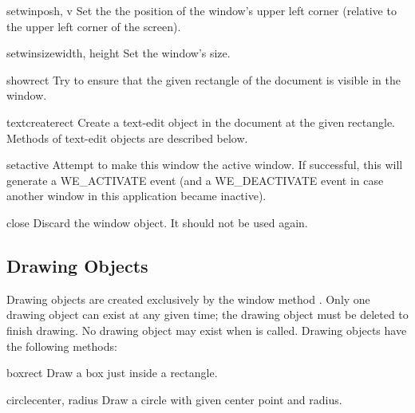 \begin{methoddesc}[window]{setwinpos}{h, v}
Set the the position of the window's upper left corner (relative to
the upper left corner of the screen).
\end{methoddesc}

\begin{methoddesc}[window]{setwinsize}{width, height}
Set the window's size.
\end{methoddesc}

\begin{methoddesc}[window]{show}{rect}
Try to ensure that the given rectangle of the document is visible in
the window.
\end{methoddesc}

\begin{methoddesc}[window]{textcreate}{rect}
Create a text-edit object in the document at the given rectangle.
Methods of text-edit objects are described below.
\end{methoddesc}

\begin{methoddesc}[window]{setactive}{}
Attempt to make this window the active window.  If successful, this
will generate a WE_ACTIVATE event (and a WE_DEACTIVATE event in case
another window in this application became inactive).
\end{methoddesc}

\begin{methoddesc}[window]{close}{}
Discard the window object.  It should not be used again.
\end{methoddesc}

\subsection{Drawing Objects}

Drawing objects are created exclusively by the window method
.  Only one drawing object can exist at any
given time; the drawing object must be deleted to finish drawing.  No
drawing object may exist when  is called.
Drawing objects have the following methods:

\begin{methoddesc}[drawing]{box}{rect}
Draw a box just inside a rectangle.
\end{methoddesc}

\begin{methoddesc}[drawing]{circle}{center, radius}
Draw a circle with given center point and radius.
\end{methoddesc}

